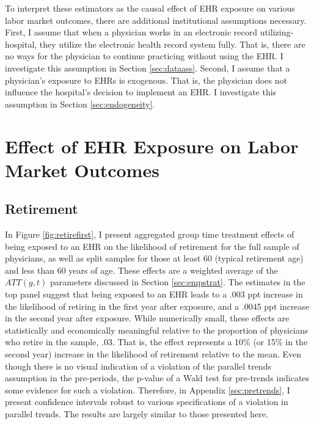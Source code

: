 \documentclass[12pt]{article}
\begin{document}
To interpret these estimators as the causal effect of EHR exposure on various labor market outcomes, there are additional institutional assumptions necessary. First, I assume that when a physician works in an electronic record utilizing-hospital, they utilize the electronic health record system fully. That is, there are no ways for the physician to continue practicing without using the EHR. I investigate this assumption in Section \ref{sec:dataass}. Second, I assume that a physician's exposure to EHRs is exogenous. That is, the physician does not influence the hospital's decision to implement an EHR. I investigate this assumption in Section \ref{sec:endogeneity}. 





\section{Effect of EHR Exposure on Labor Market Outcomes}


\subsection{Retirement}


In Figure \ref{fig:retirefirst}, I present aggregated group time treatment effects of being exposed to an EHR on the likelihood of retirement for the full sample of physicians, as well as split samples for those at least 60 (typical retirement age) and less than 60 years of age. These effects are a weighted average of the $ATT(g,t)$ parameters discussed in Section \ref{sec:empstrat}. The estimates in the top panel suggest that being exposed to an EHR leads to a .003 ppt increase in the likelihood of retiring in the first year after exposure, and a .0045 ppt increase in the second year after exposure. While numerically small, these effects are statistically and economically meaningful relative to the proportion of physicians who retire in the sample, .03. That is, the effect represents a 10\% (or 15\% in the second year) increase in the likelihood of retirement relative to the mean. Even though there is no visual indication of a violation of the parallel trends assumption in the pre-periods, the p-value of a Wald test for pre-trends indicates some evidence for such a violation. Therefore, in Appendix \ref{sec:pretrends}, I present confidence intervals robust to various specifications of a violation in parallel trends. The results are largely similar to those presented here.
\end{document}
